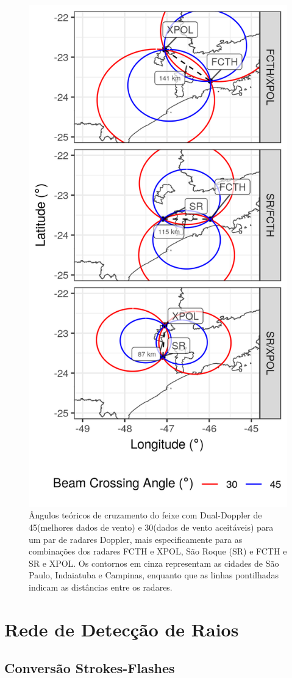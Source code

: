 \begin{figure}[htb]
	\begin{center}
		\caption{Ângulos teóricos de cruzamento do feixe com Dual-Doppler de 45\textdegree (melhores dados de vento) e 30\textdegree (dados de vento aceitáveis) para um par de radares Doppler, mais especificamente para as combinações dos radares FCTH e XPOL, São Roque (SR) e FCTH e SR e XPOL. Os contornos em cinza representam as cidades de São Paulo, Indaiatuba e Campinas, enquanto que as linhas pontilhadas indicam as distâncias entre os radares.} 
		\label{doppler_lobes}
		\includegraphics[width=0.65\columnwidth]{../General_Processing/figures/dual_doppler_lobes.png}
	\end{center}
\end{figure}


\section{Rede de Detecção de Raios}\label{raios}

\subsection{Conversão Strokes-Flashes}\label{strokestoflashes}

